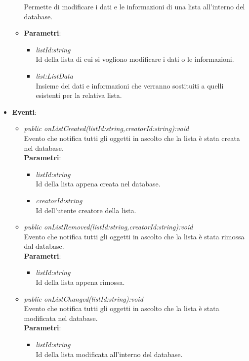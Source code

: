 \begin{itemize}
\begin{itemize}
		Permette di modificare i dati e le informazioni di una lista all'interno del database.
			\item{\textbf{Parametri}: \begin{itemize}
			\item \textit{listId:string}\\
			Id della lista di cui si vogliono modificare i dati o le informazioni.
			\item \textit{list:ListData}\\
			Insieme dei dati e informazioni che verranno sostituiti a quelli esistenti per la relativa lista.
			\end{itemize}}
	\end{itemize}
\item \textbf{Eventi}:
	\begin{itemize}
	\item \textit{public onListCreated(listId:string,creatorId:string):void}\\
		Evento che notifica tutti gli oggetti in ascolto che la lista è stata creata nel database.
			\\ \textbf{Parametri}: \begin{itemize}
			\item \textit{listId:string}\\
			Id della lista appena creata nel database.
			\item \textit{creatorId:string}\\
			Id dell'utente creatore della lista.
			\end{itemize} 
	\item \textit{public onListRemoved(listId:string,creatorId:string):void}\\
			Evento che notifica tutti gli oggetti in ascolto che la lista è stata rimossa dal database.
			\\ \textbf{Parametri}: \begin{itemize}
			\item \textit{listId:string}\\
			Id della lista appena rimossa.
			\end{itemize} 
	\item \textit{public onListChanged(listId:string):void}\\
				Evento che notifica tutti gli oggetti in ascolto che la lista è stata modificata nel database.
			\\ \textbf{Parametri}: \begin{itemize}
			\item \textit{listId:string}\\
			Id della lista modificata all'interno del database.
			\end{itemize} 
	\end{itemize}
\end{itemize}

